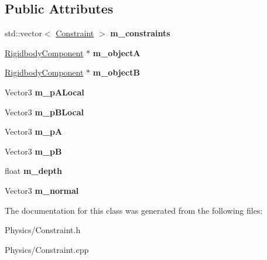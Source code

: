 \subsection*{Public Attributes}
\begin{DoxyCompactItemize}
\item 
\mbox{\label{classContact_a5db355d00ddb18ce037309fb6cbc9500}} 
std\+::vector$<$ \hyperlink{classConstraint}{Constraint} $>$ {\bfseries m\+\_\+constraints}
\item 
\mbox{\label{classContact_a9380549ad60a64820bb6ed0a3caf4e97}} 
\hyperlink{classRigidbodyComponent}{Rigidbody\+Component} $\ast$ {\bfseries m\+\_\+objectA}
\item 
\mbox{\label{classContact_a9f1e0f5aa29a630f107040c33961066a}} 
\hyperlink{classRigidbodyComponent}{Rigidbody\+Component} $\ast$ {\bfseries m\+\_\+objectB}
\item 
\mbox{\label{classContact_a6d0ef9e980ba29be6929f5aa62047f17}} 
Vector3 {\bfseries m\+\_\+p\+A\+Local}
\item 
\mbox{\label{classContact_a9d86be919bd954292afec22b844a2800}} 
Vector3 {\bfseries m\+\_\+p\+B\+Local}
\item 
\mbox{\label{classContact_a50c33e277ddeb3bd1f6ab69ee91e00e7}} 
Vector3 {\bfseries m\+\_\+pA}
\item 
\mbox{\label{classContact_a29ab504566025807593cc61f9348695a}} 
Vector3 {\bfseries m\+\_\+pB}
\item 
\mbox{\label{classContact_a351480a3ed43b421ee758c3c8ec33e2c}} 
float {\bfseries m\+\_\+depth}
\item 
\mbox{\label{classContact_af92b4be8a55d8655e0e3264d5f83f40c}} 
Vector3 {\bfseries m\+\_\+normal}
\end{DoxyCompactItemize}


The documentation for this class was generated from the following files\+:\begin{DoxyCompactItemize}
\item 
Physics/Constraint.\+h\item 
Physics/Constraint.\+cpp\end{DoxyCompactItemize}
